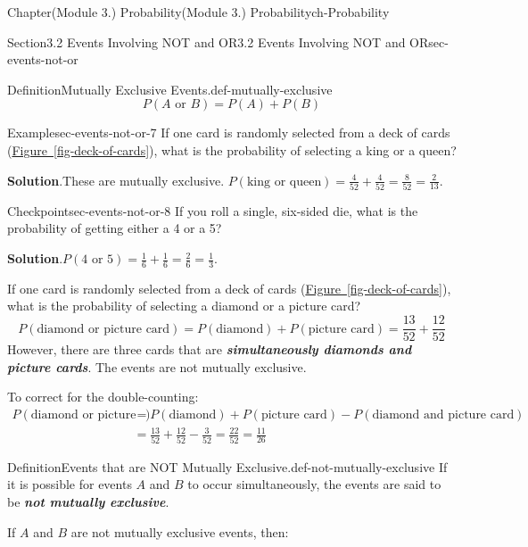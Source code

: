 \documentclass[oneside,10pt,]{book}
\newcommand{\blocktitlefont}{\relax}
\newcommand{\xreffont}{\relax}
\newcommand{\alert}[1]{\textbf{\textit{#1}}}
\newcommand{\amp}{&}
\begin{document}
\begin{chapterptx}{Chapter}{(Module 3.) Probability}{}{(Module 3.) Probability}{}{}{ch-Probability}
\begin{sectionptx}{Section}{3.2 Events Involving NOT and OR}{}{3.2 Events Involving NOT and OR}{}{}{sec-events-not-or}
\begin{definition}{Definition}{Mutually Exclusive Events.}{def-mutually-exclusive}
\begin{equation*}
P(A \text{ or } B) = P(A) + P(B)
\end{equation*}
%
\end{definition}
\begin{example}{Example}{}{sec-events-not-or-7}%
If one card is randomly selected from a deck of cards (\hyperref[fig-deck-of-cards]{Figure~{\xreffont\ref{fig-deck-of-cards}}}), what is the probability of selecting a king or a queen?%
\par\smallskip%
\noindent\textbf{\blocktitlefont Solution}.\hypertarget{sec-events-not-or-7-2}{}\quad{}These are mutually exclusive. \(P(\text{king or queen}) = \frac{4}{52} + \frac{4}{52} = \frac{8}{52} = \frac{2}{13}\).%
\end{example}
\begin{inlineexercise}{Checkpoint}{}{sec-events-not-or-8}%
If you roll a single, six-sided die, what is the probability of getting either a 4 or a 5?%
\par\smallskip%
\noindent\textbf{\blocktitlefont Solution}.\hypertarget{sec-events-not-or-8-2}{}\quad{}\(P(4 \text{ or } 5) = \frac{1}{6} + \frac{1}{6} = \frac{2}{6} = \frac{1}{3}\).%
\end{inlineexercise}%
If one card is randomly selected from a deck of cards (\hyperref[fig-deck-of-cards]{Figure~{\xreffont\ref{fig-deck-of-cards}}}), what is the probability of selecting a diamond or a picture card?%
\begin{equation*}
P(\text{diamond or picture card}) = P(\text{diamond}) + P(\text{picture card}) = \frac{13}{52} + \frac{12}{52}
\end{equation*}
However, there are three cards that are \alert{simultaneously diamonds and picture cards}. The events are not mutually exclusive.%
\par
To correct for the double-counting:%
\begin{align*}
P(\text{diamond or picture card}) \amp = P(\text{diamond}) + P(\text{picture card}) - P(\text{diamond and picture card})\\
\amp = \frac{13}{52} + \frac{12}{52} - \frac{3}{52} = \frac{22}{52} = \frac{11}{26}
\end{align*}
%
\begin{definition}{Definition}{Events that are NOT Mutually Exclusive.}{def-not-mutually-exclusive}%
If it is possible for events \(A\) and \(B\) to occur simultaneously, the events are said to be \alert{not mutually exclusive}.%
\par
If \(A\) and \(B\) are not mutually exclusive events, then:%

\end{definition}
\end{sectionptx}
\end{chapterptx}
\end{document}
